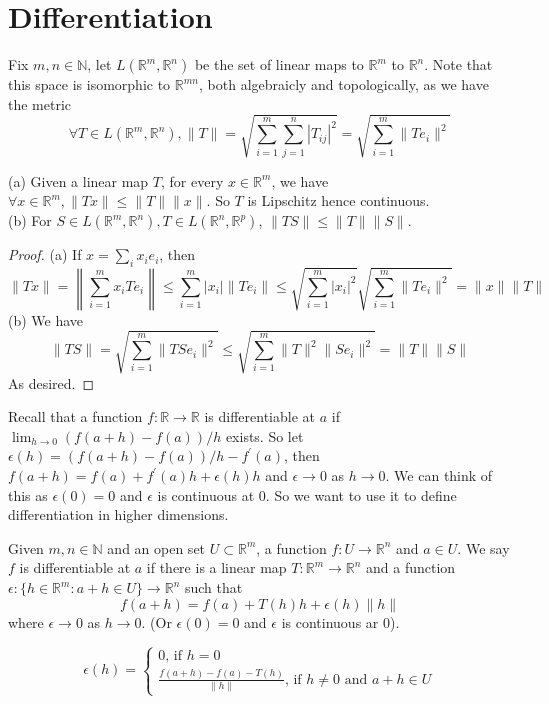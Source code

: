 \section{Differentiation}
\begin{definition}
    Fix $m,n\in\mathbb N$, let $L(\mathbb R^m,\mathbb R^n)$ be the set of linear maps to $\mathbb R^m$ to $\mathbb R^n$.
    Note that this space is isomorphic to $\mathbb R^{mn}$, both algebraicly and topologically, as we have the metric
    $$\forall T\in L(\mathbb R^m,\mathbb R^n),\|T\|=\sqrt{\sum_{i=1}^m\sum_{j=1}^n|T_{ij}|^2}=\sqrt{\sum_{i=1}^m\|T{e_i}\|^2}$$
\end{definition}
\begin{lemma}\label{mat_norm}
    (a) Given a linear map $T$, for every $x\in\mathbb R^m$, we have $\forall x\in\mathbb R^m,\|Tx\|\le \|T\|\|x\|$.
    So $T$ is Lipschitz hence continuous.\\
    (b) For $S\in L(\mathbb R^m,\mathbb R^n),T\in L(\mathbb R^n,\mathbb R^p)$, $\|TS\|\le \|T\|\|S\|$.
\end{lemma}
\begin{proof}
    (a) If $x=\sum_ix_ie_i$, then
    $$\|Tx\|=\left\|\sum_{i=1}^mx_iTe_i\right\|\le \sum_{i=1}^m|x_i|\|Te_i\|\le \sqrt{\sum_{i=1}^m|x_i|^2}\sqrt{\sum_{i=1}^m\|Te_i\|^2}=\|x\|\|T\|$$
    (b) We have
    $$\|TS\|=\sqrt{\sum_{i=1}^m\|TSe_i\|^2}\le \sqrt{\sum_{i=1}^m\|T\|^2\|Se_i\|^2}=\|T\|\|S\|$$
    As desired.
\end{proof}
Recall that a function $f:\mathbb R\to\mathbb R$ is differentiable at $a$ if $\lim_{h\to 0}(f(a+h)-f(a))/h$ exists.
So let $\epsilon(h)=(f(a+h)-f(a))/h-f^\prime(a)$, then $f(a+h)=f(a)+f^\prime(a)h+\epsilon(h)h$ and $\epsilon\to 0$ as $h\to 0$.
We can think of this as $\epsilon(0)=0$ and $\epsilon$ is continuous at $0$.
So we want to use it to define differentiation in higher dimensions.
\begin{definition}
    Given $m,n\in\mathbb N$ and an open set $U\subset\mathbb R^m$, a function $f:U\to\mathbb R^n$ and $a\in U$.
    We say $f$ is differentiable at $a$ if there is a linear map $T:\mathbb R^m\to\mathbb R^n$ and a function $\epsilon:\{h\in\mathbb R^m:a+h\in U\}\to\mathbb R^n$ such that
    $$f(a+h)=f(a)+T(h)h+\epsilon(h)\|h\|$$
    where $\epsilon\to 0$ as $h\to 0$. (Or $\epsilon(0)=0$ and $\epsilon$ is continuous ar $0$).
\end{definition}
\begin{remark}
    $$\epsilon(h)=
    \begin{cases}
        0\text{, if $h=0$}\\
        \frac{f(a+h)-f(a)-T(h)}{\|h\|}\text{, if $h\neq 0$ and $a+h\in U$}
    \end{cases}$$
\end{remark}
